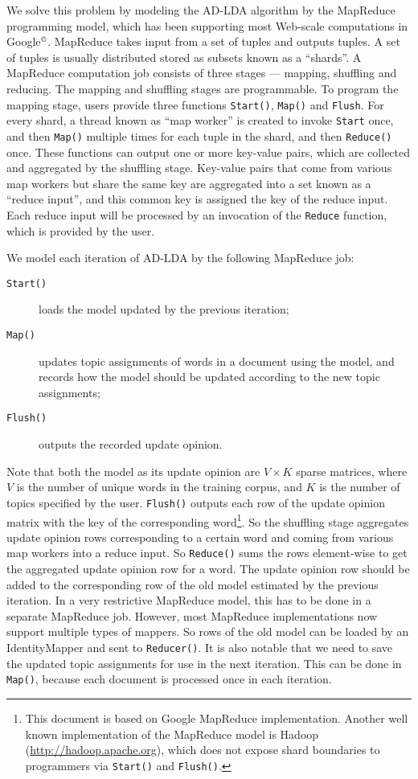 We solve this problem by modeling the AD-LDA algorithm by the
MapReduce programming model\cite{mapreduce}, which has been supporting
most Web-scale computations in Google$^\copyright$.  MapReduce takes
input from a set of tuples and outputs tuples.  A set of tuples is
usually distributed stored as subsets known as a ``shards''.  A
MapReduce computation job consists of three stages --- mapping,
shuffling and reducing.  The mapping and shuffling stages are
programmable.  To program the mapping stage, users provide three
functions \texttt{Start()}, \texttt{Map()} and \texttt{Flush}.  For
every shard, a thread known as ``map worker'' is created to invoke
\texttt{Start} once, and then \texttt{Map()} multiple times for each
tuple in the shard, and then \texttt{Reduce()} once.  These functions
can output one or more key-value pairs, which are collected and
aggregated by the shuffling stage.  Key-value pairs that come from
various map workers but share the same key are aggregated into a set
known as a ``reduce input'', and this common key is assigned the key
of the reduce input.  Each reduce input will be processed by an
invocation of the \texttt{Reduce} function, which is provided by the
user.

We model each iteration of AD-LDA by the following MapReduce job:
\begin{description}
\item[\texttt{Start()}] loads the model updated by the previous iteration;
\item[\texttt{Map()}] updates topic assignments of words in a document
  using the model, and records how the model should be updated
  according to the new topic assignments;
\item[\texttt{Flush()}] outputs the recorded update opinion.
\end{description}
Note that both the model as its update opinion are
$V\times{}K$ sparse matrices, where $V$ is the number of unique words
in the training corpus, and $K$ is the number of topics specified by
the user.  \texttt{Flush()} outputs each row of the update opinion
matrix with the key of the corresponding word\footnote{This document is
  based on Google MapReduce implementation.  Another well known
  implementation of the MapReduce model is Hadoop
  (\url{http://hadoop.apache.org}), which does not expose shard
  boundaries to programmers via \texttt{Start()} and
  \texttt{Flush()}.}.  So the shuffling stage aggregates update
opinion rows corresponding to a certain word and coming from various
map workers into a reduce input.  So \texttt{Reduce()} sums the rows
element-wise to get the aggregated update opinion row for a word.  The
update opinion row should be added to the corresponding row of the old
model estimated by the previous iteration.  In a very restrictive
MapReduce model, this has to be done in a separate MapReduce job.
However, most MapReduce implementations now support multiple types of
mappers.  So rows of the old model can be loaded by an IdentityMapper
and sent to \texttt{Reducer()}.
%
It is also notable that we need to save the updated topic assignments
for use in the next iteration.  This can be done in \texttt{Map()},
because each document is processed once in each iteration.

